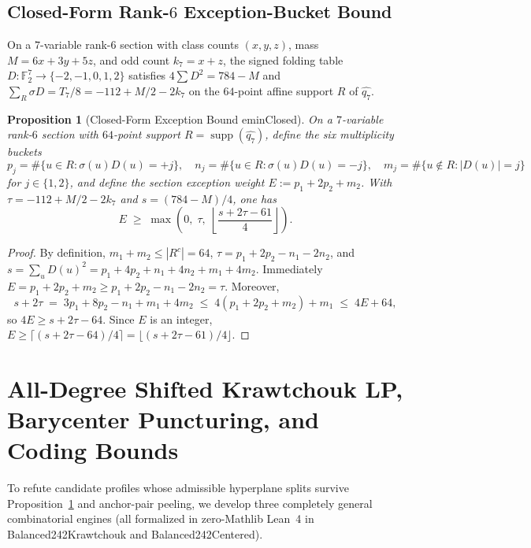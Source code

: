 \documentclass[11pt]{article}
\newtheorem{proposition}[theorem]{Proposition}
\theoremstyle{definition}
\newcommand{\F}{\mathbb{F}}
\newcommand{\supp}{\operatorname{supp}}
\newcommand{\code}[1]{{\ttfamily\small\renewcommand{\_}{\textunderscore\allowbreak}#1}}
\begin{document}
\subsection{Closed-Form Rank-$6$ Exception-Bucket Bound}

On a $7$-variable rank-$6$ section with class counts $(x, y, z)$, mass $M = 6x + 3y + 5z$, and odd count $k_7 = x + z$, the signed folding table $D : \F_2^7 \to \{-2, -1, 0, 1, 2\}$ satisfies $4\sum D^2 = 784 - M$ and $\sum_{R} \sigma D = T_7/8 = -112 + M/2 - 2k_7$ on the $64$-point affine support $R$ of $\widehat{q_7}$.

\begin{proposition}[Closed-Form Exception Bound \code{eminClosed}]
\label{prop:emin}
On a $7$-variable rank-$6$ section with $64$-point support $R = \supp(\widehat{q_7})$, define the six multiplicity buckets
\[
  p_j = \#\{u \in R : \sigma(u)D(u) = +j\},\quad
  n_j = \#\{u \in R : \sigma(u)D(u) = -j\},\quad
  m_j = \#\{u \notin R : |D(u)| = j\}
\]
for $j \in \{1, 2\}$, and define the section exception weight $E := p_1 + 2p_2 + m_2$.
With $\tau = -112 + M/2 - 2k_7$ and $s = (784 - M)/4$, one has
\[
  E \;\ge\; \max\!\left(0,\; \tau,\; \left\lfloor \frac{s + 2\tau - 61}{4} \right\rfloor\right).
\]
\end{proposition}
\begin{proof}
By definition, $m_1 + m_2 \le |R^c| = 64$, $\tau = p_1 + 2p_2 - n_1 - 2n_2$, and $s = \sum_{u} D(u)^2 = p_1 + 4p_2 + n_1 + 4n_2 + m_1 + 4m_2$.
Immediately $E = p_1 + 2p_2 + m_2 \ge p_1 + 2p_2 - n_1 - 2n_2 = \tau$.
Moreover,
\[
  s + 2\tau \;=\; 3p_1 + 8p_2 - n_1 + m_1 + 4m_2 \;\le\; 4(p_1 + 2p_2 + m_2) + m_1 \;\le\; 4E + 64,
\]
so $4E \ge s + 2\tau - 64$. Since $E$ is an integer, $E \ge \lceil(s + 2\tau - 64)/4\rceil = \lfloor(s + 2\tau - 61)/4\rfloor$.
\end{proof}

\section{All-Degree Shifted Krawtchouk LP, Barycenter Puncturing, and Coding Bounds}
\label{sec:krawtchouk}

To refute candidate profiles whose admissible hyperplane splits survive Proposition~\ref{prop:emin} and anchor-pair peeling, we develop three completely general combinatorial engines (all formalized in zero-Mathlib Lean~4 in \code{Balanced242Krawtchouk} and \code{Balanced242Centered}).
\end{document}
